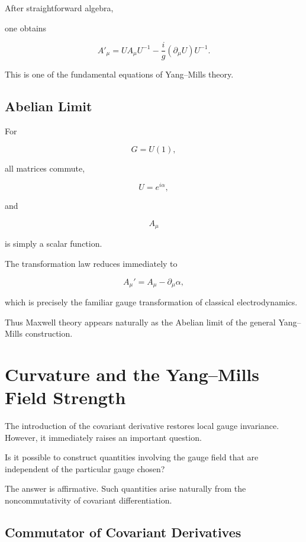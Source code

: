 After straightforward algebra,

one obtains

\[
\boxed{
A'_\mu
=
UA_\mu U^{-1}
-
\frac{i}{g}
(\partial_\mu U)
U^{-1}.
}
\]

This is one of the fundamental equations of Yang--Mills theory.


\subsection{Abelian Limit}

For

\[
G=U(1),
\]

all matrices commute,

\[
U=e^{i\alpha},
\]

and

\[
A_\mu
\]

is simply a scalar function.

The transformation law reduces immediately to

\[
\boxed{
A_\mu'
=
A_\mu
-
\partial_\mu\alpha,
}
\]

which is precisely the familiar gauge transformation of classical
electrodynamics.

Thus Maxwell theory appears naturally as the Abelian limit of the
general Yang--Mills construction.


\section{Curvature and the Yang--Mills Field Strength}

The introduction of the covariant derivative restores local gauge
invariance. However, it immediately raises an important question.

Is it possible to construct quantities involving the gauge field that
are independent of the particular gauge chosen?

The answer is affirmative. Such quantities arise naturally from the
noncommutativity of covariant differentiation.


\subsection{Commutator of Covariant Derivatives}

